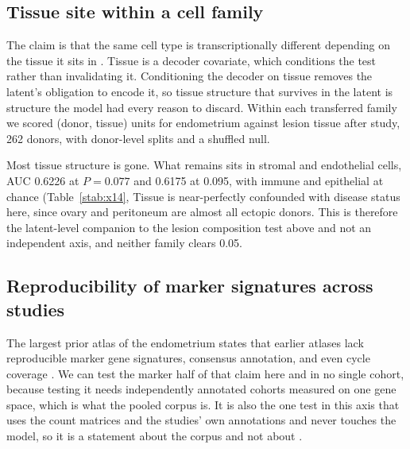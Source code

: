 \subsection{Tissue site within a cell family}

The claim is that the same cell type is transcriptionally different
depending on the tissue it sits in \citep{fonseca2023endometriosis}.
Tissue is a decoder covariate, which conditions the test rather than
invalidating it. Conditioning the decoder on tissue removes the latent's
obligation to encode it, so tissue structure that survives in the latent is
structure the model had every reason to discard. Within each transferred
family we scored (donor, tissue) units for endometrium against lesion
tissue after study, 262 donors, with donor-level splits and a shuffled
null.

Most tissue structure is gone. What remains sits in stromal and endothelial
cells, AUC 0.6226 at $P = 0.077$ and 0.6175 at 0.095, with immune and
epithelial at chance (Table~\ref{stab:x14},
Tissue is near-perfectly confounded
with disease status here, since ovary and peritoneum are almost all ectopic
donors. This is therefore the latent-level companion to the lesion
composition test above and not an independent axis, and neither family
clears 0.05.

\begin{table}[t]
\centering
\caption[X14, tissue within a family]{\textbf{Endometrium against lesion
tissue within each transferred family}, 262 donors.}
\label{stab:x14}
\small

\end{table}

\subsection{Reproducibility of marker signatures across studies}

The largest prior atlas of the endometrium states that earlier atlases lack
reproducible marker gene signatures, consensus annotation, and even cycle
coverage \citep{mareckova2024heca}. We can test the marker half of that
claim here and in no single cohort, because testing it needs independently
annotated cohorts measured on one gene space, which is what the pooled
corpus is. It is also the one test in this axis that uses the count
matrices and the studies' own annotations and never touches the model, so
it is a statement about the corpus and not about \elaj{}.

